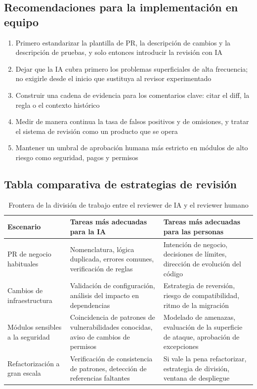 \documentclass[a4paper]{article}
\begin{document}
\subsection{Recomendaciones para la implementación en equipo}

\begin{enumerate}
    \item Primero estandarizar la plantilla de PR, la descripción de cambios y la descripción de pruebas, y solo entonces introducir la revisión con IA
    \item Dejar que la IA cubra primero los problemas superficiales de alta frecuencia; no exigirle desde el inicio que sustituya al revisor experimentado
    \item Construir una cadena de evidencia para los comentarios clave: citar el diff, la regla o el contexto histórico
    \item Medir de manera continua la tasa de falsos positivos y de omisiones, y tratar el sistema de revisión como un producto que se opera
    \item Mantener un umbral de aprobación humana más estricto en módulos de alto riesgo como seguridad, pagos y permisos
\end{enumerate}

\subsection{Tabla comparativa de estrategias de revisión}

\begin{table}[H]
\centering
\begin{tabular}{p{} p{} p{}}
\toprule
Escenario & Tareas más adecuadas para la IA & Tareas más adecuadas para las personas \\
\midrule
PR de negocio habituales & Nomenclatura, lógica duplicada, errores comunes, verificación de reglas & Intención de negocio, decisiones de límites, dirección de evolución del código \\
Cambios de infraestructura & Validación de configuración, análisis del impacto en dependencias & Estrategia de reversión, riesgo de compatibilidad, ritmo de la migración \\
Módulos sensibles a la seguridad & Coincidencia de patrones de vulnerabilidades conocidas, aviso de cambios de permisos & Modelado de amenazas, evaluación de la superficie de ataque, aprobación de excepciones \\
Refactorización a gran escala & Verificación de consistencia de patrones, detección de referencias faltantes & Si vale la pena refactorizar, estrategia de división, ventana de despliegue \\
\bottomrule
\end{tabular}
\caption{Frontera de la división de trabajo entre el reviewer de IA y el reviewer humano}
\end{table}
\end{document}
